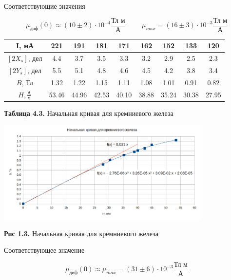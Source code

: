 \documentclass{article}
\begin{document}
Соответствующие значения 

\begin{equation*}
    \mu_{\text{диф}}(0) \approx (10 \pm 2) \cdot 10^{-4} \frac{\text{Тл м}}{\text{А}} \hspace{1cm} \mu_{max} = (16 \pm 3) \cdot 10^{-3} \frac{\text{Тл м}}{\text{А}}
\end{equation*}

\newpage

\begin{center}
    \begin{tabular}{|c|c|c|c|c|c|c|c|c|}
        \hline
        I, мА & 221 & 191 & 181 & 171 & 162 & 152 & 133 & 120 \\
        \hline
        \([2X_{s}]\), дел & 4.4 & 3.7 & 3.5 & 3.3 & 3.2 & 2.9 & 2.5 & 2.3 \\
        \hline
        \([2Y_{s}]\), дел & 5.5 & 5.1 & 4.8 & 4.6 & 4.5 & 4.2 & 3.8 & 3.4 \\
        \hline
        \(B\), Тл & 1.32 & 1.22	& 1.15 & 1.11 & 1.08 & 1.01 & 0.91 & 0.82 \\
        \hline
        \(H, \frac{\text{А}}{\text{м}}\) & 53.46 & 44.96 & 42.53 & 40.10 & 38.88 & 35.24 & 30.38 & 27.95 \\
        \hline
    \end{tabular}
    
    \textbf{Таблица 4.3.} Начальная кривая для кремниевого железа
\end{center}

\begin{center}
    \includegraphics[width=0.8\textwidth]{curve_init_ferrum.png}
    
    \textbf{Рис 1.3.} Начальная кривая для кремниевого железа
\end{center}

Соответствующее значение 

\begin{equation*}
    \mu_{\text{диф}}(0) \approx \mu_{max} = (31 \pm 6) \cdot 10^{-3} \frac{\text{Тл м}}{\text{А}}
\end{equation*}
\end{document}
